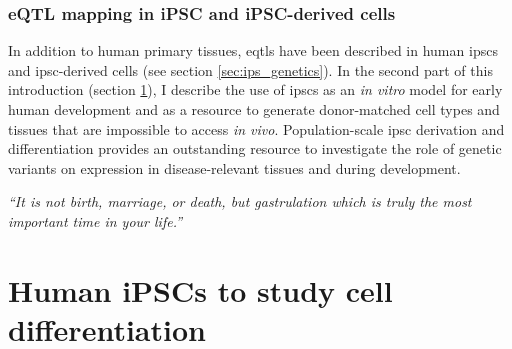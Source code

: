 

\subsubsection{eQTL mapping in iPSC and iPSC-derived cells}

In addition to human primary tissues, \glspl{eqtl} have been described in human \glspl{ipsc} and \gls{ipsc}-derived cells (see section \ref{sec:ips_genetics}).
In the second part of this introduction (section \ref{sec:human_ipscs}), I describe the use of \glspl{ipsc} as an \textit{in vitro} model for early human development and as a resource to generate donor-matched cell types and tissues that are impossible to access \textit{in vivo}.
Population-scale \gls{ipsc} derivation and differentiation provides an outstanding resource to investigate the role of genetic variants on expression in disease-relevant tissues and during development.



\newpage

\vspace*{10px}

\textit{“It is not birth, marriage, or death, but gastrulation which is truly the most important time in your life.”}\\

\vspace*{5px}


\section{Human iPSCs to study cell differentiation}  %
\label{sec:human_ipscs}  

